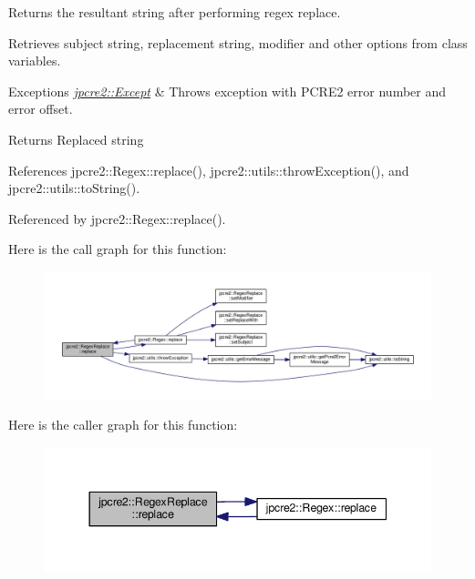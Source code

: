 Returns the resultant string after performing regex replace. 

Retrieves subject string, replacement string, modifier and other options from class variables.


\begin{DoxyExceptions}{Exceptions}
{\em \hyperlink{classjpcre2_1_1Except}{jpcre2\+::\+Except}} & Throws exception with P\+C\+R\+E2 error number and error offset. \\
\hline
\end{DoxyExceptions}
\begin{DoxyReturn}{Returns}
Replaced string 
\end{DoxyReturn}


References jpcre2\+::\+Regex\+::replace(), jpcre2\+::utils\+::throw\+Exception(), and jpcre2\+::utils\+::to\+String().



Referenced by jpcre2\+::\+Regex\+::replace().



Here is the call graph for this function\+:\nopagebreak
\begin{figure}[H]
\begin{center}
\leavevmode
\includegraphics[width=350pt]{classjpcre2_1_1RegexReplace_afd087fa7a9bfedec802d1a3dd7edbdd0_cgraph}
\end{center}
\end{figure}




Here is the caller graph for this function\+:\nopagebreak
\begin{figure}[H]
\begin{center}
\leavevmode
\includegraphics[width=344pt]{classjpcre2_1_1RegexReplace_afd087fa7a9bfedec802d1a3dd7edbdd0_icgraph}
\end{center}
\end{figure}


